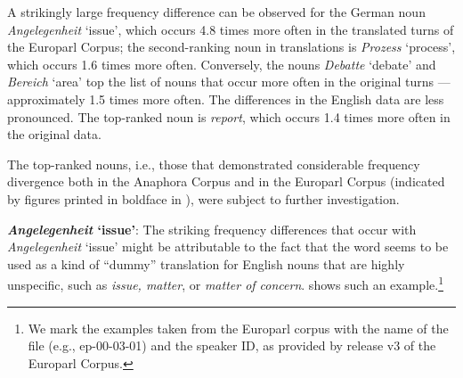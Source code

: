 \documentclass[output=paper]{LSP/langsci}
\begin{document}
A strikingly large frequency difference can be observed for the German noun \textit{Angelegenheit} `issue', which occurs 4.8 times more often in the translated turns of the Europarl Corpus; the second-ranking noun in translations is \textit{Prozess} `process', which occurs 1.6 times more often. Conversely, the nouns \textit{Debatte} `debate' and \textit{Bereich} `area' top the list of nouns that occur more often in the original turns --- approximately  1.5 times more often. The differences in the English data are less pronounced. The top-ranked noun is \textit{report}, which occurs 1.4 times more often in the original data.





The top-ranked nouns, i.e., those that demonstrated considerable frequency divergence both in the Anaphora Corpus and in the Europarl Corpus (indicated by figures printed in boldface in ), were subject to further investigation.

{\bfseries {\itshape Angelegenheit} `issue'}: The striking frequency differences that occur with \textit{Angelegenheit} `issue' might be attributable to the fact that the word seems to be used as a kind of ``dummy'' translation for English nouns that are highly unspecific, such as \textit{issue, matter}, or  \textit{matter of concern}.  shows such an example.\footnote{We mark the examples taken from the Europarl corpus with the name of the file (e.g., ep-00-03-01)  and the speaker ID, as provided by release v3 of the Europarl Corpus.}
\end{document}
